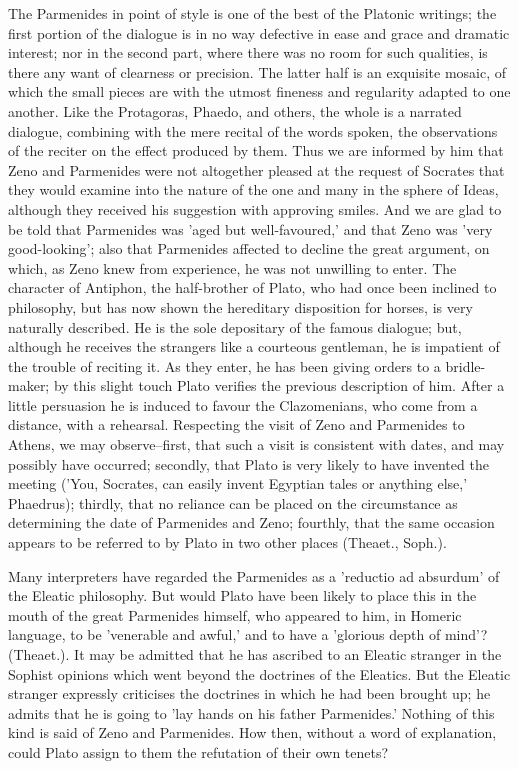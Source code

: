 The Parmenides in point of style is one of the best of the Platonic
writings; the first portion of the dialogue is in no way defective in
ease and grace and dramatic interest; nor in the second part, where
there was no room for such qualities, is there any want of clearness or
precision. The latter half is an exquisite mosaic, of which the small
pieces are with the utmost fineness and regularity adapted to one
another. Like the Protagoras, Phaedo, and others, the whole is a
narrated dialogue, combining with the mere recital of the words spoken,
the observations of the reciter on the effect produced by them. Thus we
are informed by him that Zeno and Parmenides were not altogether pleased
at the request of Socrates that they would examine into the nature of
the one and many in the sphere of Ideas, although they received his
suggestion with approving smiles. And we are glad to be told that
Parmenides was 'aged but well-favoured,' and that Zeno was 'very
good-looking'; also that Parmenides affected to decline the great
argument, on which, as Zeno knew from experience, he was not unwilling
to enter. The character of Antiphon, the half-brother of Plato, who
had once been inclined to philosophy, but has now shown the hereditary
disposition for horses, is very naturally described. He is the sole
depositary of the famous dialogue; but, although he receives the
strangers like a courteous gentleman, he is impatient of the trouble of
reciting it. As they enter, he has been giving orders to a bridle-maker;
by this slight touch Plato verifies the previous description of him.
After a little persuasion he is induced to favour the Clazomenians, who
come from a distance, with a rehearsal. Respecting the visit of Zeno
and Parmenides to Athens, we may observe--first, that such a visit is
consistent with dates, and may possibly have occurred; secondly, that
Plato is very likely to have invented the meeting ('You, Socrates, can
easily invent Egyptian tales or anything else,' Phaedrus); thirdly, that
no reliance can be placed on the circumstance as determining the date
of Parmenides and Zeno; fourthly, that the same occasion appears to be
referred to by Plato in two other places (Theaet., Soph.).

Many interpreters have regarded the Parmenides as a 'reductio ad
absurdum' of the Eleatic philosophy. But would Plato have been likely to
place this in the mouth of the great Parmenides himself, who appeared
to him, in Homeric language, to be 'venerable and awful,' and to have
a 'glorious depth of mind'? (Theaet.). It may be admitted that he has
ascribed to an Eleatic stranger in the Sophist opinions which went
beyond the doctrines of the Eleatics. But the Eleatic stranger expressly
criticises the doctrines in which he had been brought up; he admits that
he is going to 'lay hands on his father Parmenides.' Nothing of this
kind is said of Zeno and Parmenides. How then, without a word of
explanation, could Plato assign to them the refutation of their own
tenets?

